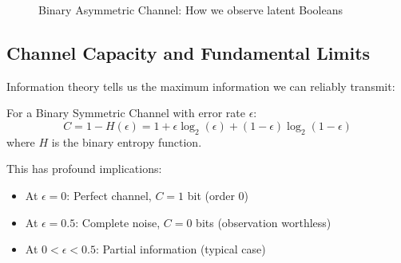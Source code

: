 \begin{figure}[h]
\centering
{}
\caption{Binary Asymmetric Channel: How we observe latent Booleans}
\end{figure}

\subsection{Channel Capacity and Fundamental Limits}

Information theory tells us the maximum information we can reliably transmit:

\begin{theorem}
For a Binary Symmetric Channel with error rate $\epsilon$:
\begin{equation}
C = 1 - H(\epsilon) = 1 + \epsilon \log_2(\epsilon) + (1-\epsilon)\log_2(1-\epsilon)
\end{equation}
where $H$ is the binary entropy function.
\end{theorem}

This has profound implications:
\begin{itemize}
\item At $\epsilon = 0$: Perfect channel, $C = 1$ bit (order 0)
\item At $\epsilon = 0.5$: Complete noise, $C = 0$ bits (observation worthless)
\item At $0 < \epsilon < 0.5$: Partial information (typical case)
\end{itemize}

